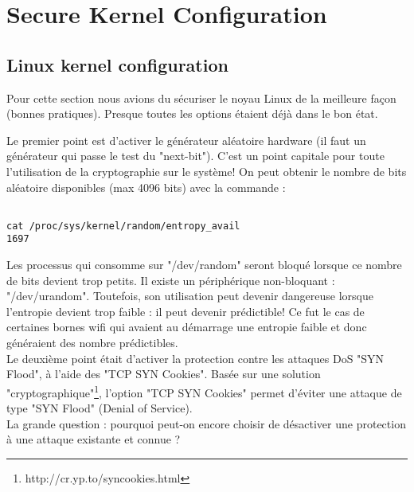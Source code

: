 
\chapter{Secure Kernel Configuration} %

\label{Chapitre 3} %


\section{Linux kernel configuration}
Pour cette section nous avions du sécuriser le noyau Linux de la meilleure façon (bonnes pratiques). Presque toutes les options étaient déjà dans le bon état.

Le premier point est d'activer le générateur aléatoire hardware (il faut un générateur qui passe le test du "next-bit"). C'est un point capitale pour toute l'utilisation de la cryptographie sur le système! On peut obtenir le nombre de bits aléatoire disponibles (max 4096 bits) avec la commande :

\begin{lstlisting}[frame=single,style=Console]  % Start your code-block

cat /proc/sys/kernel/random/entropy_avail
1697
\end{lstlisting}
Les processus qui consomme sur "/dev/random" seront bloqué lorsque ce nombre de bits devient trop petits. Il existe un périphérique non-bloquant : "/dev/urandom". Toutefois, son utilisation peut devenir dangereuse lorsque l'entropie devient trop faible : il peut devenir prédictible! Ce fut le cas de certaines bornes wifi qui avaient au démarrage une entropie faible et donc généraient des nombre prédictibles.\\


Le deuxième point était d'activer la protection contre les attaques DoS "SYN Flood", à l'aide des "TCP SYN Cookies". 
Basée sur une solution "cryptographique"\footnote{http://cr.yp.to/syncookies.html}, l'option "TCP SYN Cookies" permet d'éviter une attaque de type "SYN Flood" (Denial of Service).\\
La grande question : pourquoi peut-on encore choisir de désactiver une protection à une attaque existante et connue ? \\

